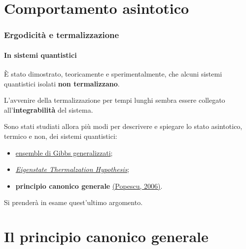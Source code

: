 \documentclass{beamer}
\theoremstyle{definition}
\theoremstyle{plain}
\begin{document}
\section{Comportamento asintotico}
\begin{frame}
	\frametitle{Ergodicità e termalizzazione}
	\framesubtitle{In sistemi quantistici}
	\hypertarget{overview}{}
	
	\`E stato dimostrato, teoricamente e sperimentalmente, che alcuni sistemi quantistici isolati \textbf{non termalizzano}.
	
	\pause
	L'avvenire della termalizzazione per tempi lunghi sembra essere collegato all'\textbf{integrabilità} del sistema.
	
	\pause
	Sono stati studiati allora più modi per descrivere e spiegare lo stato asintotico, termico e non, dei sistemi quantistici:
	
	\pause
	\begin{itemize}[<+->]
		\item \hyperlink{GGE}{ensemble di Gibbs generalizzati};
		\item \hyperlink{ETH}{\textit{Eigenstate Thermalzation Hypothesis}};
		\item \textbf{principio canonico generale} \hyperlink{bib}{(Popescu, 2006)}.
	\end{itemize}

	Si prenderà in esame quest'ultimo argomento.

\end{frame}

\section{Il principio canonico generale}
\end{document}
